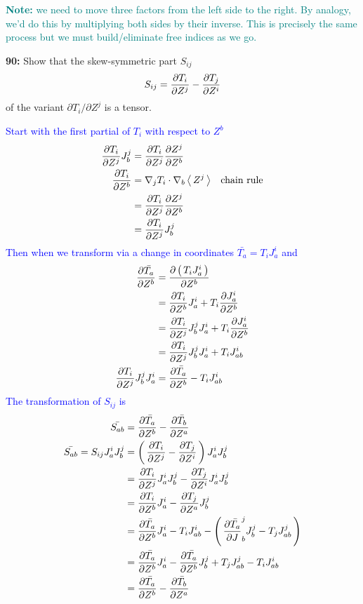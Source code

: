 \documentclass[12pt,a4paper]{report}
\newcommand{\BLUE}[1]{\textcolor{blue}{#1}}
\newcommand{\TEAL}[1]{\textcolor{teal}{#1}}
\begin{document}
\TEAL{\textbf{Note: }we need to move three factors from the left side to the right.  By analogy, we'd do this by multiplying both sides by their inverse.  This is precisely the same process but we must build/eliminate free indices as we go.\\
}

\textbf{90: }Show that the skew-symmetric part $S_{ij}$
\begin{align*}
	S_{ij} = \frac{\partial T_i}{\partial Z^j}-\frac{\partial T_j}{\partial Z^i}
\end{align*}of the variant $\partial T_i/\partial Z^j$ is a tensor.

\BLUE{Start with the first partial of $T_i$ with respect to $Z^b$
\begin{align*}
	\frac{\partial T_i}{\partial Z^j}J^j_b &= \frac{\partial T_i}{\partial Z^j}\frac{\partial Z^j}{\partial Z^b}\\
	\frac{\partial T_i}{\partial Z^b} &= \nabla_j T_i\cdot \nabla_b\left \langle\, Z^j \,\right \rangle &\text{chain rule}\\
	&= \frac{\partial T_i}{\partial Z^j}\frac{\partial Z^j}{\partial Z^b} \\
	&= \frac{\partial T_i}{\partial Z^j}J^j_b
\end{align*}Then when we transform via a change in coordinates $\bar{T_a} = T_iJ^i_a$ and
\begin{align*}
	\frac{\partial \bar{T_a}}{\partial Z^b} &= \frac{\partial \left (\, T_iJ^i_a \,\right )}{\partial Z^b} \\
	&= \frac{\partial T_i}{\partial Z^b}J^i_a+T_i\frac{\partial J^i_a}{\partial Z^b} \\
	&= \frac{\partial T_i}{\partial Z^j}J^j_bJ^i_a+T_i\frac{\partial J^i_a}{\partial Z^b} \\
	&=\frac{\partial T_i}{\partial Z^j}J^j_bJ^i_a+T_iJ^i_{ab} \\
	\frac{\partial T_i}{\partial Z^j}J^j_bJ^i_a &= \frac{\partial \bar{T_a}}{\partial Z^b} - T_iJ^i_{ab}
\end{align*}The transformation of $S_{ij}$ is
\begin{align*}
	\bar{S_{ab}} &= \frac{\partial \bar{T_a}}{\partial Z^b}-\frac{\partial \bar{T_b}}{\partial Z^a} \\
	\bar{S_{ab}} = S_{ij}J^i_aJ^j_b &=  \left (\, \frac{\partial T_i}{\partial Z^j}-\frac{\partial T_j}{\partial Z^i} \,\right )J^i_aJ^j_b \\
	&= \frac{\partial T_i}{\partial Z^j}J^i_aJ^j_b-\frac{\partial T_j}{\partial Z^i}J^i_aJ^j_b \\
	&= \frac{\partial T_i}{\partial Z^b}J^i_a-\frac{\partial T_j}{\partial Z^a}J^j_b \\
	&=  \frac{\partial \bar{T_a}}{\partial Z^b}J^i_a - T_iJ^i_{ab} - \left (\,  \frac{\partial \bar{T_a}}{\partial J}^j_b{J^j_b} - T_jJ^j_{ab} \,\right ) \\
	&=  \frac{\partial \bar{T_a}}{\partial Z^b}J^i_a - \frac{\partial \bar{T_a}}{\partial Z^b}J^j_b + T_jJ^j_{ab} -  T_iJ^i_{ab} \\
	&= \frac{\partial \bar{T_a}}{\partial Z^b}-\frac{\partial \bar{T_b}}{\partial Z^a}
\end{align*}
}
\end{document}
